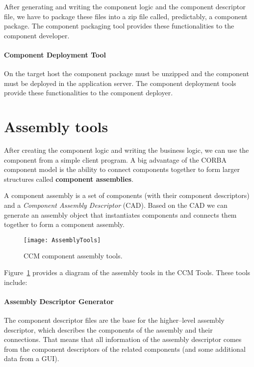 After generating and writing the component logic and the component descriptor
file, we have to package these files into a zip file called, predictably, a
component package. The component packaging tool provides these functionalities
to the component developer.

\paragraph{Component Deployment Tool}

On the target host the component package must be unzipped and the component must
be deployed in the application server. The component deployment tools provide
these functionalities to the component deployer.

\section{Assembly tools}

After creating the component logic and writing the business logic, we can use
the component from a simple client program. A big advantage of the CORBA
component model is the ability to connect components together to form larger
structures called {\bf component assemblies}.

A component assembly is a set of components (with their component descriptors)
and a {\it Component Assembly Descriptor} (CAD). Based on the CAD we can
generate an assembly object that instantiates components and connects them
together to form a component assembly.

\begin{figure}[!htb]
\texttt{[image: AssemblyTools]}
\caption{CCM component assembly tools.}
\label{fig:intro-AssemblyTools}
\end{figure}

Figure~\ref{fig:intro-AssemblyTools} provides a diagram of the assembly tools in
the CCM Tools. These tools include:

\paragraph{Assembly Descriptor Generator}

The component descriptor files are the base for the higher--level assembly
descriptor, which describes the components of the assembly and their
connections. That means that all information of the assembly descriptor comes
from the component descriptors of the related components (and some additional
data from a GUI).

